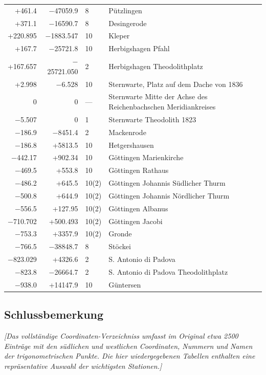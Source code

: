 \documentclass[12pt,a4paper]{article}
\begin{document}
\begin{longtable}{r r l p{6cm}}
+461.4 & $-$47059.9 & 8 & P\"utzlingen \\
+371.1 & $-$16590.7 & 8 & Desingerode \\
+220.895 & $-$1883.547 & 10 & Kleper \\
+167.7 & $-$25721.8 & 10 & Herbigshagen Pfahl \\
+167.657 & $-$25721.050 & 2 & Herbigshagen Theodolithplatz \\
+2.998 & $-$6.528 & 10 & Sternwarte, Platz auf dem Dache von 1836 \\
0 & 0 & --- & Sternwarte Mitte der Achse des Reichenbachschen Meridiankreises \\
$-$5.507 & 0 & 1 & Sternwarte Theodolith 1823 \\
$-$186.9 & $-$8451.4 & 2 & Mackenrode \\
$-$186.8 & +5813.5 & 10 & Hetgershausen \\
$-$442.17 & +902.34 & 10 & G\"ottingen Marienkirche \\
$-$469.5 & +553.8 & 10 & G\"ottingen Rathaus \\
$-$486.2 & +645.5 & 10(2) & G\"ottingen Johannis S\"udlicher Thurm \\
$-$500.8 & +644.9 & 10(2) & G\"ottingen Johannis N\"ordlicher Thurm \\
$-$556.5 & +127.95 & 10(2) & G\"ottingen Albanus \\
$-$710.702 & +500.493 & 10(2) & G\"ottingen Jacobi \\
$-$753.3 & +3357.9 & 10(2) & Gronde \\
$-$766.5 & $-$38848.7 & 8 & St\"ockei \\
$-$823.029 & +4326.6 & 2 & S. Antonio di Padova \\
$-$823.8 & $-$26664.7 & 2 & S. Antonio di Padova Theodolithplatz \\
$-$938.0 & +14147.9 & 10 & G\"untersen \\
\end{longtable}

\normalsize

\newpage
\subsection*{Schlussbemerkung}

\textit{[Das vollst\"andige Coordinaten-Verzeichniss umfasst im Original etwa 2500
Eintr\"age mit den s\"udlichen und westlichen Coordinaten, Nummern und Namen
der trigonometrischen Punkte. Die hier wiedergegebenen Tabellen enthalten
eine repr\"asentative Auswahl der wichtigsten Stationen.]}
\end{document}
